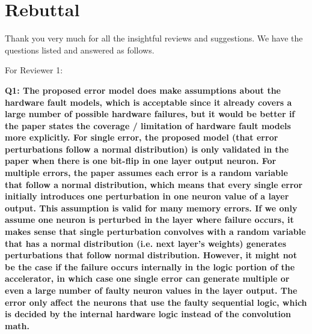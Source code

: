 \section{Rebuttal}
Thank you very much for all the insightful reviews and suggestions. We have the questions listed and answered as follows.

For Reviewer 1:

\textbf{Q1: The proposed error model does make assumptions about the hardware fault models, which is acceptable since it already covers a large number of possible hardware failures, but it would be better if the paper states the coverage / limitation of hardware fault models more explicitly. For single error, the proposed model (that error perturbations follow a normal distribution) is only validated in the paper when there is one bit-flip in one layer output neuron. For multiple errors, the paper assumes each error is a random variable that follow a normal distribution, which means that every single error initially introduces one perturbation in one neuron value of a layer output. This assumption is valid for many memory errors. If we only assume one neuron is perturbed in the layer where failure occurs, it makes sense that single perturbation convolves with a random variable that has a normal distribution (i.e. next layer’s weights) generates perturbations that follow normal distribution. However, it might not be the case if the failure occurs internally in the logic portion of the accelerator, in which case one single error can generate multiple or even a large number of faulty neuron values in the layer output. The error only affect the neurons that use the faulty sequential logic, which is decided by the internal hardware logic instead of the convolution math.}

